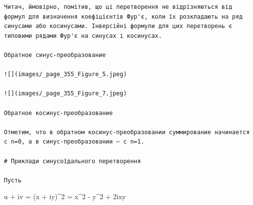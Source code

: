 \documentclass[
  ukrainian,
]{article}
\begin{document}
\begin{verbatim}
Читач, ймовірно, помітив, що ці перетворення не відрізняються від формул для визначення коефіцієнтів Фур'є, коли їх розкладають на ряд синусами або косинусами. Інверсійні формули для цих перетворень є типовими рядами Фур'є на синусах і косинусах.

Обратное синус-преобразование

![](images/_page_355_Figure_5.jpeg)

![](images/_page_355_Figure_7.jpeg)

Обратное косинус-преобразование

Отметим, что в обратном косинус-преобразовании суммирование начинается с n=0, а в синус-преобразовании — с n=1.

# Приклади синусоїдального перетворення

Пусть
\end{verbatim}

u + iv = (x + iy)\^{}2 = x\^{}2 - y\^{}2 + 2ixy
\end{document}
